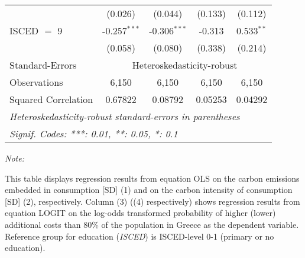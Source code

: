 \begin{table}[htbp!]
\begin{adjustbox}{width = 1\textwidth, max height = 0.95\textheight, center}
\begin{threeparttable}[b]
\begin{tabular}{lcccc}
                                 & (0.026)            & (0.044)            & (0.133)        & (0.112)\\   
            ISCED $=$ 9          & -0.257$^{***}$     & -0.306$^{***}$     & -0.313         & 0.533$^{**}$\\   
                                 & (0.058)            & (0.080)            & (0.338)        & (0.214)\\   
            \midrule 
            Standard-Errors & \multicolumn{4}{c}{Heteroskedasticity-robust} \\ 
            Observations         & 6,150              & 6,150              & 6,150          & 6,150\\  
            Squared Correlation  & 0.67822            & 0.08792            & 0.05253        & 0.04292\\  
            \midrule \midrule
            \multicolumn{5}{l}{\emph{Heteroskedasticity-robust standard-errors in parentheses}}\\
            \multicolumn{5}{l}{\emph{Signif. Codes: ***: 0.01, **: 0.05, *: 0.1}}\\
         \end{tabular}
         
         \begin{tablenotes}\item \medskip \textit{Note:}
            \item This table displays regression results from equation OLS on the carbon emissions embedded in consumption [SD] (1) and on the carbon intensity of consumption [SD] (2), respectively. 
                                      Column (3) ((4) respectively) shows regression results from equation LOGIT on the log-odds transformed probability of higher (lower) additional costs than 80\% of the population in Greece as the dependent variable. Reference group for education (\textit{ISCED}) is ISCED-level 0-1 (primary or no education).
         \end{tablenotes}
      \end{threeparttable}
   \end{adjustbox}
\end{table}


